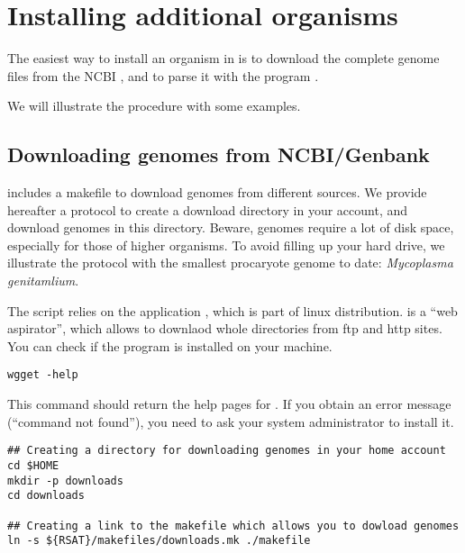 
\section{Installing additional organisms}

The easiest way to install an organism in \RSAT is to download the
complete genome files from the NCBI
, and to parse it with the
program .

We will illustrate the procedure with some examples. 

\subsection{Downloading genomes from NCBI/Genbank}

\RSAT includes a makefile to download genomes from different sources.
We provide hereafter a protocol to create a download directory in your
account, and download genomes in this directory. Beware, genomes
require a lot of disk space, especially for those of higher
organisms. To avoid filling up your hard drive, we illustrate the protocol
with the smallest procaryote genome to date: \textit{Mycoplasma
  genitamlium}.

The script  relies on the
application , which is part of linux
distribution.  is a ``web aspirator'', which allows to
downlaod whole directories from ftp and http sites. You can check if
the program is installed on your machine.

\begin{verbatim}
wgget -help
\end{verbatim}

This command should return the help pages for .  If you
obtain an error message (``command not found''), you need to ask your
system administrator to install it.

\begin{verbatim}
## Creating a directory for downloading genomes in your home account
cd $HOME
mkdir -p downloads
cd downloads

## Creating a link to the makefile which allows you to dowload genomes
ln -s ${RSAT}/makefiles/downloads.mk ./makefile
\end{verbatim}

